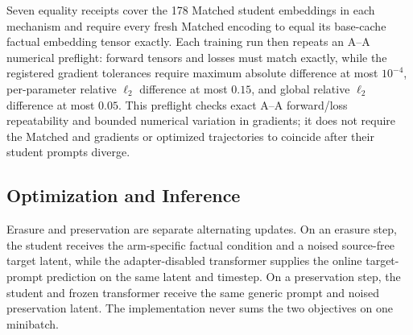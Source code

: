 Seven equality receipts cover the 178 Matched student embeddings in each
mechanism and require every fresh Matched encoding to equal its base-cache
factual embedding tensor exactly.  Each training run then repeats an A--A
numerical preflight: forward tensors and losses must match exactly, while the
registered gradient tolerances require maximum absolute difference at most
\(10^{-4}\), per-parameter relative \(\ell_2\) difference at most \(0.15\),
and global relative \(\ell_2\) difference at most \(0.05\).  This preflight
checks exact A--A forward/loss repeatability and bounded numerical variation
in gradients; it does not require the
Matched and \methodshort{} gradients or optimized trajectories to coincide
after their student prompts diverge.

\subsection{Optimization and Inference}
\label{app:optimization-details}

Erasure and preservation are separate alternating updates.  On an erasure
step, the student receives the arm-specific factual condition and a noised
source-free target latent, while the adapter-disabled transformer supplies the
online target-prompt prediction on the same latent and timestep.  On a
preservation step, the student and frozen transformer receive the same generic
prompt and noised preservation latent.  The implementation never sums the two
objectives on one minibatch.

